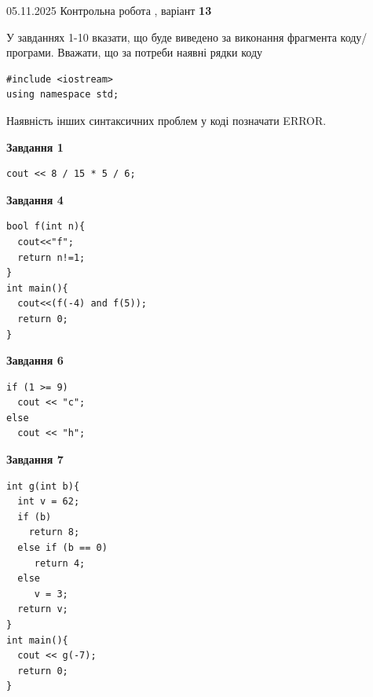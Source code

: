 \documentclass[12pt, ukrainian]{article}
\begin{document}
{\Large{05.11.2025 Контрольна робота , варіант  \No \textbf { 13 }\par}}
{
\begin {large}
У завданнях 1-10 вказати, що буде виведено за виконання фрагмента коду/про\-гра\-ми.
Вважати, що за потреби наявні рядки коду
\begin{verbatim}
#include <iostream>
using namespace std;
\end{verbatim}
Наявність інших синтаксичних проблем у коді позначати ERROR.

\begin{minipage}[t]{7.0cm}

\begin{center}
\textbf{Завдання 1}
\end{center}
\vspace{-8mm}

\begin{verbatim}
cout << 8 / 15 * 5 / 6;
\end{verbatim}



\begin{center}
\textbf{Завдання 4}
\end{center}
\vspace{-8mm}

\begin{verbatim}
bool f(int n){
  cout<<"f";
  return n!=1;
}
int main(){
  cout<<(f(-4) and f(5));
  return 0;
}
\end{verbatim}



\begin{center}
\textbf{Завдання 6}
\end{center}
\vspace{-8mm}

\begin{verbatim}
if (1 >= 9)
  cout << "c";
else
  cout << "h";
\end{verbatim}



\begin{center}
\textbf{Завдання 7}
\end{center}
\vspace{-8mm}

\begin{verbatim}
int g(int b){
  int v = 62;
  if (b)
    return 8;
  else if (b == 0)
     return 4;
  else
     v = 3;
  return v;
}
int main(){
  cout << g(-7);
  return 0;
}
\end{verbatim}


\end{minipage}
\end{large}}
\end{document}
